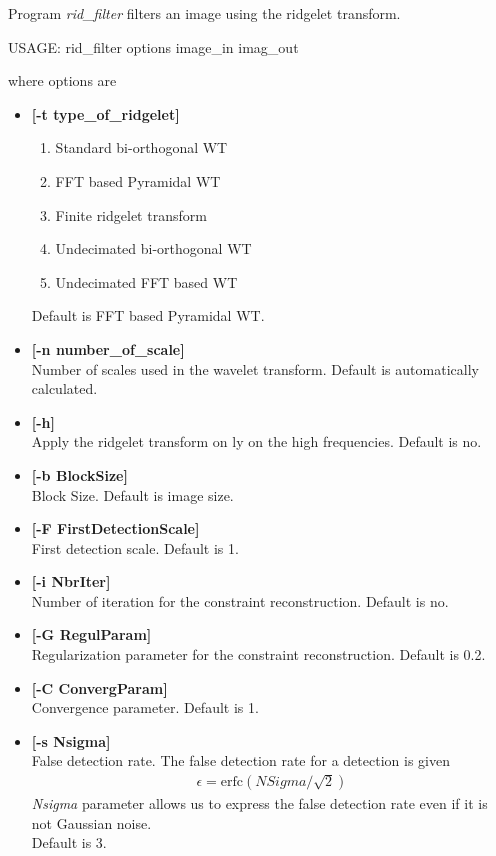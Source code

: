 \documentclass[11pt,a4paper]{article}
\begin{document}
Program {\em rid\_filter} filters an image using the ridgelet transform.
\begin{center}
 USAGE:  rid\_filter options image\_in imag\_out
\end{center}
where options are 
\begin{itemize}
\item {\bf [-t type\_of\_ridgelet]} \\
\begin{enumerate}
\item Standard bi-orthogonal WT
\item FFT based Pyramidal WT  
\item Finite ridgelet transform
\item Undecimated bi-orthogonal WT 
\item Undecimated FFT based WT  
\end{enumerate}
Default is FFT based Pyramidal WT.

\item {\bf [-n number\_of\_scale]} \\
 Number of scales used in the wavelet transform.
 Default is automatically calculated.

\item {\bf [-h]} \\
Apply the ridgelet transform on ly on the high frequencies.
Default is no.

\item {\bf [-b BlockSize]} \\
Block Size. Default is image size.

\item {\bf [-F FirstDetectionScale]} \\
 First detection scale. Default is 1. 


\item {\bf [-i NbrIter]}  \\
 Number of iteration for the constraint reconstruction.
  Default is no. 

\item {\bf [-G RegulParam]}  \\
  Regularization parameter for the constraint reconstruction.
 Default is 0.2.

\item {\bf [-C ConvergParam]}  \\
 Convergence parameter. Default is 1.

\item {\bf [-s Nsigma]} \\
False detection rate. The false detection rate for a detection is given
\begin{eqnarray}
\epsilon =  \mbox{erfc}( NSigma / \sqrt{2})
\end{eqnarray}
{\em Nsigma} parameter allows us to express the false detection rate
even if it is not Gaussian noise. \\
Default is 3.


\end{itemize}
\end{document}
